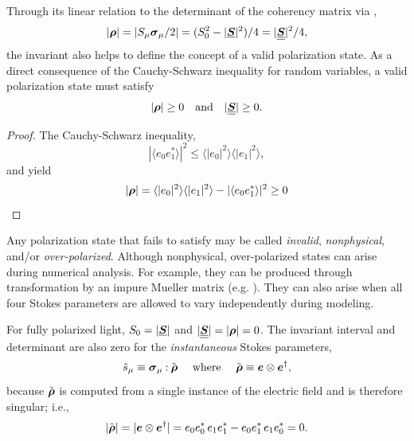 Through its linear relation to the determinant of the coherency matrix via ,
\begin{equation}
|\mbox{\boldmath $\rho$}| = | S_\mu \mbox{\boldmath $\sigma$}_{\mu} / 2 | 
    = (S_0^2 -|\underline{\mbox{\boldmath $S$}}|^2) / 4 = |\underline{\underline{\mbox{\boldmath $S$}}}|^2/4,
\label{eqn:invariant}
\end{equation}
the invariant also helps to define the concept of a valid polarization state.  As a direct consequence of the Cauchy-Schwarz inequality for
random variables, a valid polarization state must satisfy
\begin{equation}
|\mbox{\boldmath $\rho$}| \ge 0 \quad\text{and}\quad |\underline{\underline{\mbox{\boldmath $S$}}}| \ge 0.
\label{eqn:valid}
\end{equation}

\begin{proof}
The Cauchy-Schwarz inequality,
\begin{equation}
| \langle e_0 e_1^* \rangle |^2 \le
\langle |e_0|^2 \rangle \langle |e_1|^2 \rangle \nonumber,
\end{equation}
and  yield
\begin{equation}
|\mbox{\boldmath $\rho$}| = \langle |e_0|^2 \rangle \langle |e_1|^2 \rangle - | \langle e_0 e_1^* \rangle |^2 \ge 0 \nonumber
\end{equation}
\end{proof}
%
\noindent
Any polarization state that fails to satisfy  may be called \emph{invalid}, \emph{nonphysical}, and/or \emph{over-polarized}.
%
Although nonphysical, over-polarized states can arise during numerical analysis.
%
For example, they can be produced through transformation by an impure Mueller matrix (e.g. ).
%
They can also arise when all four Stokes parameters are allowed to vary independently during modeling.
%
%
% 

For fully polarized light, $S_0 = |\underline{\mbox{\boldmath $S$}}|$ and
$|\underline{\underline{\mbox{\boldmath $S$}}}| = |\mbox{\boldmath $\rho$}| = 0$.
%
The invariant interval and determinant are also zero for the \emph{instantaneous} Stokes parameters,
\begin{equation}
\label{eqn:instantaneous_coherency}
  \tilde{s}_\mu \equiv \mbox{\boldmath $\sigma$}_{\mu}\mathbin{:}\tilde{\mbox{\boldmath $\rho$}}
\text{ \quad where \quad} 
    \tilde{\mbox{\boldmath $\rho$}} \equiv \mbox{\boldmath $e$} \otimes \mbox{\boldmath $e$}^\dagger,
\end{equation}
%
because $\tilde{\mbox{\boldmath $\rho$}}$ is computed from a single instance of the electric field
and is therefore singular; i.e.,
%
\begin{equation}
 |\tilde{\mbox{\boldmath $\rho$}}| = |\mbox{\boldmath $e$} \otimes \mbox{\boldmath $e$}^\dagger| = e_0 e_0^* \, e_1 e_1^* - e_0 e_1^* \, e_1 e_0^* = 0.
\label{eqn:instantaneous_coherency_determinant}
\end{equation}


